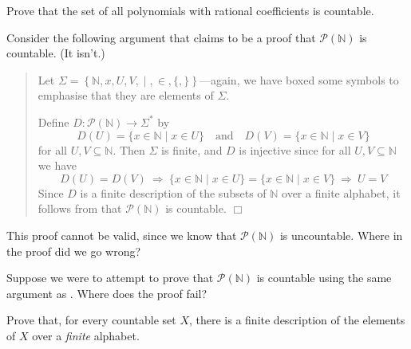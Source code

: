 \begin{exercise}
Prove that the set of all polynomials with rational coefficients is countable.
\end{exercise}

\begin{exercise}
Consider the following argument that claims to be a proof that $\mathcal{P}(\mathbb{N})$ is countable. (It isn't.)
\begin{quote}
Let $\Sigma = \left\{ \mathbb{N},x,U,V,\boxed{\mid},\boxed{\in},\boxed{\{},\boxed{\}} \right\}$---again, we have boxed some symbols to emphasise that they are elements of $\Sigma$.

Define $D : \mathcal{P}(\mathbb{N}) \to \Sigma^*$ by
\[ D(U) = \{ x \in \mathbb{N} \mid x \in U \} \quad \text{and} \quad D(V) = \{ x \in \mathbb{N} \mid x \in V \} \]
for all $U, V \subseteq \mathbb{N}$. Then $\Sigma$ is finite, and $D$ is injective since for all $U,V \subseteq \mathbb{N}$ we have
\[ D(U) = D(V) ~ \Rightarrow ~ \{ x \in \mathbb{N} \mid x \in U \} = \{ x \in \mathbb{N} \mid x \in V \} ~ \Rightarrow ~ U = V \]
Since $D$ is a finite description of the subsets of $\mathbb{N}$ over a finite alphabet, it follows from  that $\mathcal{P}(\mathbb{N})$ is countable. \hfill $\Box$
\end{quote}
This proof cannot be valid, since we know that $\mathcal{P}(\mathbb{N})$ is uncountable. Where in the proof did we go wrong?
\end{exercise}

\begin{exercise}
Suppose we were to attempt to prove that $\mathcal{P}(\mathbb{N})$ is countable using the same argument as . Where does the proof fail?
\end{exercise}

\begin{exercise}
Prove that, for every countable set $X$, there is a finite description of the elements of $X$ over a \textit{finite} alphabet.
\end{exercise}